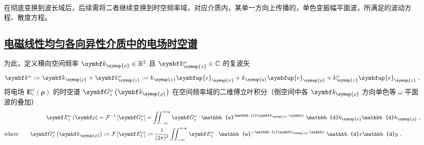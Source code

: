 在彻底变换到波长域后，后续需将二者继续变换到时空频率域，对应介质内，某单一方向上传播的，单色变振幅平面波，所满足的波动方程、散度方程。

\subsection{\protect\hyperlink{chap:\thesubsection}{电磁线性均匀各向异性介质中的电场时空谱}}
\label{电磁线性均匀各向异性介质中的电场时空谱}

为此，定义横向空间频率 $\symbf k_{\symup{\rho}} \in \mathbb{R}^2$ 且 $\symbf k^\omega_{\symup{z}} \in \mathbb{C}$ 的复波矢
\begin{equation} \label{eq:2-17}
	\symbf k^\omega := \symbf k_{\symup{\rho}} + \symbf k^\omega_{\symup{z}} := k_{\symup{x}} \symbfup{e}_{\symup{x}} + k_{\symup{y}} \symbfup{e}_{\symup{y}} + k^\omega_{\symup{z}} \symbfup{e}_{\symup{z}} ~,
\end{equation}
将电场 $\symbf E^{\omega}_z \left( \symbf \rho \right)$ 的时空谱 $\symbf G^{\omega}_z \left( \symbf k_{\symup{\rho}} \right)$ 在空间频率域的二维傅立叶积分（倒空间中各 $\symbf k_{\symup{\rho}}$ 方向单色等 $\omega$ 平面波的叠加）
\begin{subequations} \label{eq:2-18}
	\begin{align}
		\symbf E^{\omega}_z \left( \symbf \rho \right) = \mathcal F^{-1} \left[ \symbf G^{\omega}_z \right] &= \iint_{-\infty}^{+\infty} \symbf G^{\omega}_z \cdot {\mathbb{e}^{\mathbb{i} \symbf k_{\symup{\rho}} \cdot \symbf \rho}} ~ {\mathbb{d}{k_{\symup{x}}} \mathbb{d}{k_{\symup{y}}}} ~,\label{eq:2-18a}\\ \text{where}\ \ \ \ \ \ \symbf G^{\omega}_z \left( \symbf k_{\symup{\rho}} \right) := \mathcal F \left[ \symbf E^{\omega}_z \right] &:= \frac{1}{(2\pi)^2} \iint_{-\infty}^{+\infty} \symbf E^{\omega}_z \cdot {\mathbb{e}^{-\mathbb{i} \symbf k_{\symup{\rho}} \cdot \symbf \rho}} ~ {\mathbb{d}{x} \mathbb{d}{y}} ~,\label{eq:2-18b}
	\end{align}
\end{subequations}
